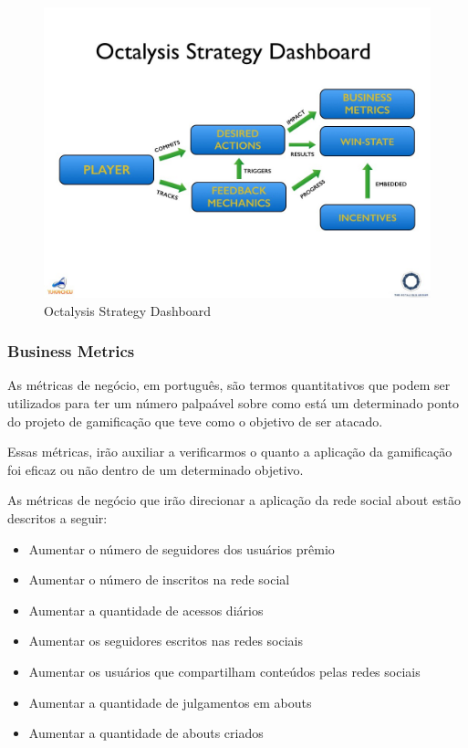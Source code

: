  \begin{figure}[h]
     \centering

     \includegraphics[width=450px, scale=1]{figuras/dashboard}
     \caption{Octalysis Strategy Dashboard}

     \label{fig:dashboard}
 \end{figure}

\subsubsection{Business Metrics}
\label{sub:business_metrics}
As métricas de negócio, em português, são termos quantitativos que podem ser utilizados
para ter um número palpaável sobre como está um determinado ponto do projeto de gamificação
que teve como o objetivo de ser atacado.

Essas métricas, irão auxiliar a verificarmos o quanto a aplicação da gamificação foi 
eficaz ou não dentro de um determinado objetivo.

As métricas de negócio que irão direcionar a aplicação da rede social about estão
descritos a seguir:

\begin{itemize}
    \item Aumentar o número de seguidores dos usuários prêmio
    \item Aumentar o número de inscritos na rede social
    \item Aumentar a quantidade de acessos diários
    \item Aumentar os seguidores escritos nas redes sociais
    \item Aumentar os usuários que compartilham conteúdos pelas redes sociais
    \item Aumentar a quantidade de julgamentos em abouts
    \item Aumentar a quantidade de abouts criados
\end{itemize}

